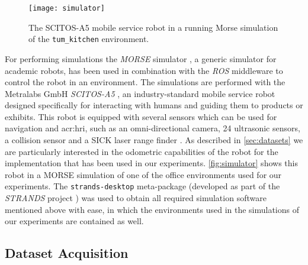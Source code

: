 \begin{figure}[t]
	\centering
	\texttt{[image: simulator]}
	\caption{The SCITOS-A5 mobile service robot in a running Morse simulation of the \texttt{tum\_kitchen} environment.}
	\label{fig:simulator}
\end{figure}

For performing simulations the \textit{MORSE} simulator \cite{morse_simpar_2012}, a generic simulator for academic robots, has been used in combination with the \textit{ROS} middleware to control the robot in an environment.
The simulations are performed with the Metralabs GmbH \textit{SCITOS-A5} \cite{Metralabs}, an industry-standard mobile service robot designed specifically for interacting with humans and guiding them to products or exhibits.
This robot is equipped with several sensors which can be used for navigation and \acrfull{acr:hri}, such as an omni-directional camera, 24 ultrasonic sensors, a collision sensor and a SICK laser range finder \cite{gross2008shopbot}.
As described in \autoref{sec:datasets} we are particularly interested in the odometric capabilities of the robot for the implementation that has been used in our experiments.
\autoref{fig:simulator} shows this robot in a MORSE simulation of one of the office environments used for our experiments.
The \texttt{strands-desktop} meta-package (developed as part of the \textit{STRANDS} project \cite{hawes2017strands}) was used to obtain all required simulation software mentioned above with ease, in which the environments used in the simulations of our experiments are contained as well.


\subsection{Dataset Acquisition}
\label{sec:datasets}

